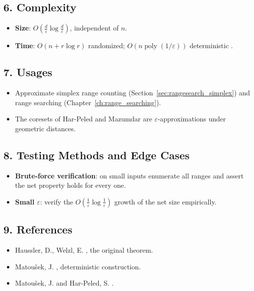 \subsection{6. Complexity}

\begin{itemize}
\item \textbf{Size}: $O(\frac{d}{\varepsilon}\log\frac{d}{\varepsilon})$,
  independent of $n$.
\item \textbf{Time}: $O(n + r \log r)$ randomized; $O(n
  \operatorname{poly}(1/\varepsilon))$ deterministic \cite{matousek1990}.
\end{itemize}

\subsection{7. Usages}

\begin{itemize}
\item Approximate simplex range counting (Section~\ref{sec:rangesearch_simplex})
  and range searching (Chapter~\ref{ch:range_searching}).
\item The coresets of Har-Peled and Mazumdar \cite{harpeled2004} are
  $\varepsilon$-approximations under geometric distances.
\end{itemize}

\subsection{8. Testing Methods and Edge Cases}

\begin{itemize}
\item \textbf{Brute-force verification}: on small inputs enumerate all ranges
  and assert the net property holds for every one.
\item \textbf{Small $\varepsilon$}: verify the $O(\frac{1}{\varepsilon}\log
  \frac{1}{\varepsilon})$ growth of the net size empirically.
\end{itemize}

\subsection{9. References}

\begin{itemize}
\item Haussler, D., Welzl, E. \cite{hausslerwelzl1987}, the original theorem.
\item Matou\v{s}ek, J. \cite{matousek1990}, deterministic construction.
\item Matou\v{s}ek, J. \cite{matousek1999} and Har-Peled, S. \cite{harpeled2011}.
\end{itemize}

